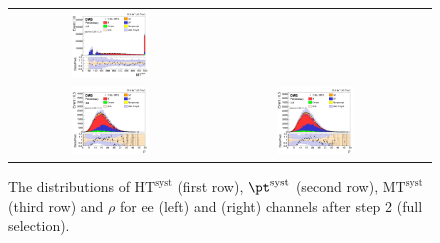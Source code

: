\begin{figure}[ht]
\begin{center}
\begin{tabular}{ccc}
      \includegraphics[width=0.4\textwidth]{figures/tW/fig/Step2/mumu/H_MT_sys.png}  \\
      \includegraphics[width=0.4\textwidth]{figures/tW/fig/Step2/ee/H_rho.png}&
      \includegraphics[width=0.4\textwidth]{figures/tW/fig/Step2/mumu/H_rho.png}\\
    \end{tabular}
    \caption{The distributions of $\mathrm{HT^{syst}}$ (first row), $\mathrm{\pt^{syst}}$ (second row), $\mathrm{MT^{syst}}$ (third row)  and $\rho$ for ee (left) and \mumu (right) channels after step 2 (full selection).
    \label{fig:step2_HT_Pt_Mt_rho}}
  \end{center}
\end{figure}




